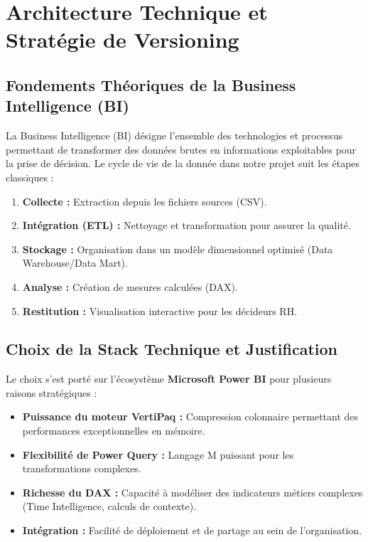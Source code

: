 \chapter{Architecture Technique et Stratégie de Versioning}

\section{Fondements Théoriques de la Business Intelligence (BI)}
La Business Intelligence (BI) désigne l'ensemble des technologies et processus permettant de transformer des données brutes en informations exploitables pour la prise de décision. Le cycle de vie de la donnée dans notre projet suit les étapes classiques :
\begin{enumerate}
    \item \textbf{Collecte :} Extraction depuis les fichiers sources (CSV).
    \item \textbf{Intégration (ETL) :} Nettoyage et transformation pour assurer la qualité.
    \item \textbf{Stockage :} Organisation dans un modèle dimensionnel optimisé (Data Warehouse/Data Mart).
    \item \textbf{Analyse :} Création de mesures calculées (DAX).
    \item \textbf{Restitution :} Visualisation interactive pour les décideurs RH.
\end{enumerate}

\section{Choix de la Stack Technique et Justification}
Le choix s'est porté sur l'écosystème \textbf{Microsoft Power BI} pour plusieurs raisons stratégiques :
\begin{itemize}
    \item \textbf{Puissance du moteur VertiPaq :} Compression colonnaire permettant des performances exceptionnelles en mémoire.
    \item \textbf{Flexibilité de Power Query :} Langage M puissant pour les transformations complexes.
    \item \textbf{Richesse du DAX :} Capacité à modéliser des indicateurs métiers complexes (Time Intelligence, calculs de contexte).
    \item \textbf{Intégration :} Facilité de déploiement et de partage au sein de l'organisation.
\end{itemize}

